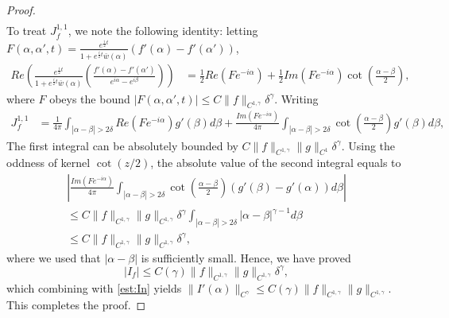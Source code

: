 \documentclass[11pt,reqno]{amsproc}
\newcommand{\be}{\begin{equation}}
\newcommand{\ee}{\end{equation}}
\newcommand{\ba}{\begin{array}{l}}
\newcommand{\ea}{\end{array}}
\begin{document}
\begin{proof}
\begin{align*}
    \end{align*}
    To treat $J_f^{1,1}$, we note the following identity: letting $F(\alpha,\alpha',t) = \frac{e^{\frac{i}{2}t}}{1+ e^{\frac{i}{2}t}\bar{w}(\alpha)}(f'(\alpha) - f'(\alpha'))$,
    \begin{align*}
        Re\left(\frac{e^{\frac{i}{2}t}}{1+ e^{\frac{i}{2}t}\bar{w}(\alpha)}\left(\frac{f'(\alpha) - f'(\alpha')}{e^{i\alpha} - e^{i\beta}}\right)\right) &= \frac12 Re\left(F e^{-i\alpha}\right) + \frac12 Im\left(F e^{-i\alpha}\right)\cot\left(\frac{\alpha - \beta}{2}\right),
    \end{align*}
    where $F$ obeys the bound $|F(\alpha,\alpha',t)| \le C\|f\|_{C^{1,\gamma}} \delta^\gamma$. Writing
    \begin{align*}
        J_{f}^{1,1} &= \frac{1}{4\pi} \int_{|\alpha - \beta| > 2\delta} Re\left(F e^{-i\alpha}\right) g'(\beta) d\beta + \frac{Im\left(F e^{-i\alpha}\right)}{4\pi}\int_{|\alpha - \beta| > 2\delta}\cot\left(\frac{\alpha - \beta}{2}\right)g'(\beta) d\beta,
    \end{align*}
    The first integral can be absolutely bounded by $C\|f\|_{C^{1,\gamma}} \|g\|_{C^1}\delta^\gamma$. Using the oddness of kernel $\cot(z/2)$, the absolute value of the second integral equals to
    \be
    \ba
        \left|\frac{Im\left(F e^{-i\alpha}\right)}{4\pi}\int_{|\alpha - \beta| > 2\delta}\cot\left(\frac{\alpha - \beta}{2}\right)(g'(\beta)-g'(\alpha)) d\beta\right| \\ \le C\|f\|_{C^{1,\gamma}}\|g\|_{C^{1,\gamma}}\delta^\gamma\int_{|\alpha-\beta|>2\delta}|\alpha - \beta|^{\gamma - 1}d\beta\\
        \le C\|f\|_{C^{1,\gamma}}\|g\|_{C^{1,\gamma}}\delta^\gamma,
    \ea
    \ee
    where we used that $|\alpha - \beta|$ is sufficiently small. Hence, we have proved
    \begin{equation}
        \label{est:If}
        |I_f| \le C(\gamma)\|f\|_{C^{1,\gamma}}\|g\|_{C^{1,\gamma}}\delta^\gamma,
    \end{equation}
    which combining with \eqref{est:In} yields $\|I'(\alpha)\|_{C^\gamma} \le C(\gamma)\|f\|_{C^{1,\gamma}}\|g\|_{C^{1,\gamma}}$. This completes the proof.
\end{proof}
\end{document}
